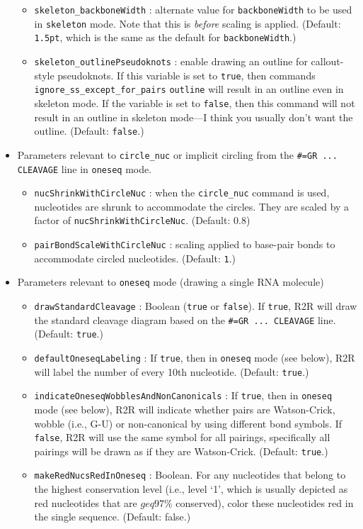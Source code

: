 \documentclass[letterpaper,12pt]{report}
\begin{document}
\begin{itemize}
\begin{itemize}
	\item {\tt skeleton\_backboneWidth} : alternate value for {\tt backboneWidth} to be used in {\tt skeleton} mode.  Note that this is {\em before} scaling is applied. (Default: {\tt 1.5pt}, which is the same as the default for {\tt backboneWidth}.)
	\item {\tt skeleton\_outlinePseudoknots} : enable drawing an outline for callout-style pseudoknots.  If this variable is set to {\tt true}, then commands {\tt ignore\_ss\_except\_for\_pairs} {\tt outline} will result in an outline even in skeleton mode.  If the variable is set to {\tt false}, then this command will not result in an outline in skeleton mode---I think you usually don't want the outline.  (Default: {\tt false}.)
	\end{itemize}
\item Parameters relevant to {\tt circle\_nuc} or implicit circling from the {\tt \#=GR ... CLEAVAGE} line
in {\tt oneseq} mode.
	\begin{itemize}
	\item {\tt nucShrinkWithCircleNuc} : when the {\tt circle\_nuc} command is used, nucleotides are shrunk to accommodate the circles.  They are scaled by a factor of {\tt nucShrinkWithCircleNuc}.  (Default: 0.8)
	\item {\tt pairBondScaleWithCircleNuc} : scaling applied to base-pair bonds to accommodate circled nucleotides.  (Default: {\tt 1}.)
	\end{itemize}
\item Parameters relevant to {\tt oneseq} mode (drawing a single RNA molecule)
	\begin{itemize}
	\item {\tt drawStandardCleavage} : Boolean ({\tt true} or {\tt false}).  If {\tt true}, R2R will draw the standard cleavage diagram based on the {\tt \#=GR ... CLEAVAGE} line.  (Default: {\tt true}.)
	\item {\tt defaultOneseqLabeling} : If {\tt true}, then in {\tt oneseq} mode (see below), R2R will label the number of every 10th nucleotide. (Default: {\tt true}.)
	\item {\tt indicateOneseqWobblesAndNonCanonicals} : If {\tt true}, then in {\tt oneseq} mode (see below), R2R will indicate whether pairs are Watson-Crick, wobble (i.e., G-U) or non-canonical by using different bond symbols.  If {\tt false}, R2R will use the same symbol for all pairings, specifically all pairings will be drawn as if they are Watson-Crick.  (Default: {\tt true}.)
        \item {\tt makeRedNucsRedInOneseq} : Boolean.  For any nucleotides that belong to the highest conservation level (i.e., level `1', which is usually depicted as red nucleotides that are $geq 97\%$ conserved), color these nucleotides red in the single sequence.  (Default: false.)

\end{itemize}
\end{itemize}
\end{document}
